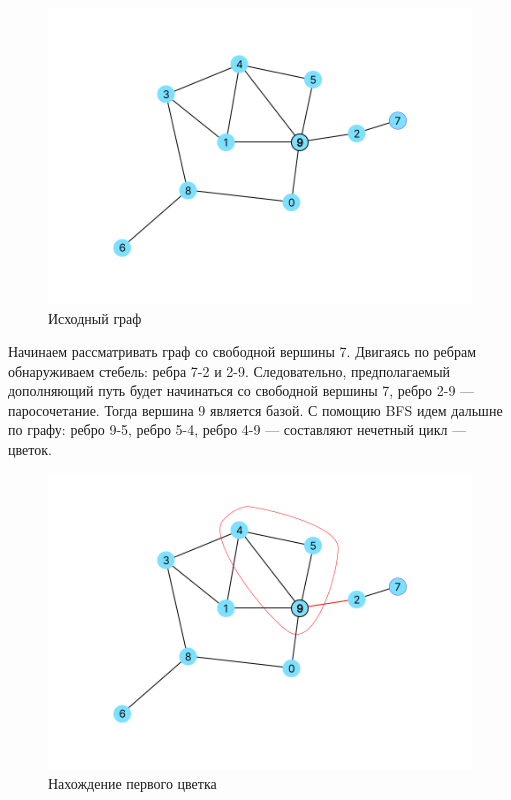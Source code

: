\documentclass[14pt, a4paper]{extarticle}
\begin{document}
    \begin{figure}[h!]
        \centering
        \includegraphics[scale=0.3]{1.png}
        \caption{Исходный граф}
        \label{fig:my_label}
    \end{figure}

    Начинаем рассматривать граф со свободной вершины 7. Двигаясь по ребрам обнаруживаем стебель: ребра 7-2 и  2-9. Следовательно, предполагаемый дополняющий путь будет начинаться со свободной вершины 7, ребро 2-9 --- паросочетание. Тогда вершина 9 является базой. С помощию BFS идем дальшне по графу:
    ребро 9-5, ребро 5-4, ребро 4-9 --- составляют нечетный цикл --- цветок.
    
    \begin{figure}[h!]
        \centering
        \includegraphics[scale=0.3]{2.png}
        \caption{Нахождение первого цветка}
        \label{fig:my_label}
    \end{figure}
\end{document}
